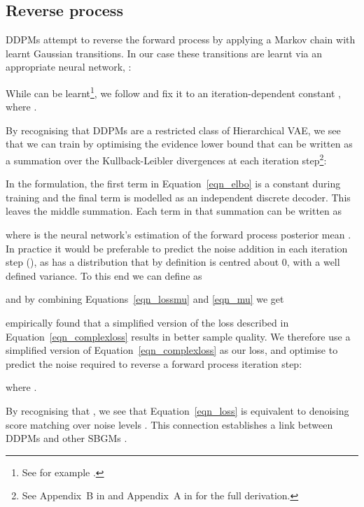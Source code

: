 \documentclass[fleqn,usenatbib]{mnras}
\begin{document}
\subsection{Reverse process}

DDPMs attempt to reverse the forward process by applying a Markov chain with
learnt Gaussian transitions. In our case these transitions are learnt via an
appropriate neural network, :

While  can be learnt\footnote{See for
example \citet{cite_nichol2021}.}, we follow \citet{cite_ho2020} and fix it to
an iteration-dependent constant , where
\mbox{}.

By recognising that DDPMs are a restricted class of Hierarchical VAE, 
we see that we can train  by optimising the evidence lower bound
\citep[ELBO, introduced in][]{cite_kingma2014} that can be written as a
summation over the Kullback-Leibler divergences at each iteration
step\footnote{
    See Appendix~B in \citet{cite_sohldickstein2015} and
    Appendix~A in \citet{cite_ho2020} for the full derivation.  
}:

In the \citet{cite_ho2020} formulation, the first term in
Equation~\ref{eqn_elbo} is a constant during training and the final term is
modelled as an independent discrete decoder. This leaves the middle summation.
Each term in that summation can be written as

where  is the neural network's estimation of the forward process
posterior mean . In practice it would be preferable to predict the noise
addition in each iteration step (), as  has a distribution that by
definition is centred about 0, with a well defined variance.  To this end we
can define  as

and by combining Equations~\ref{eqn_lossmu} and \ref{eqn_mu} we get


\citet{cite_ho2020} empirically found that a simplified version of the loss
described in Equation~\ref{eqn_complexloss} results in better sample quality.
We therefore use a simplified version of Equation~\ref{eqn_complexloss} as our
loss, and optimise to predict the noise required to reverse a forward process
iteration step:

where .

By recognising that , we see that Equation~\ref{eqn_loss} is equivalent to
denoising score matching over  noise levels \citep{cite_vincent2011}.  This
connection establishes a link between DDPMs and other SBGMs \citep[such
as][]{cite_song2019,cite_song2020,cite_ajm2020}.  
\end{document}
